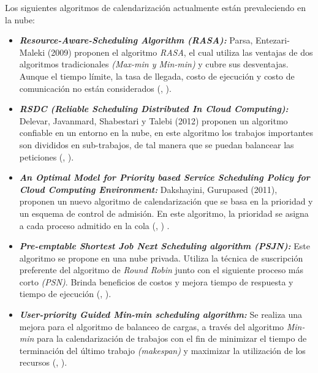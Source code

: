 Los siguientes algoritmos de calendarizaci\'on actualmente est\'an prevaleciendo en la nube:
\begin{itemize}
	\item \textit{\textbf{Resource-Aware-Scheduling Algorithm (RASA):}} Parsa, Entezari-Maleki (2009) proponen el algoritmo \textit{RASA}, el cual utiliza las ventajas de dos algoritmos tradicionales \textit{(Max-min y Min-min)} y cubre sus desventajas. Aunque el tiempo l\'imite, la tasa de llegada, costo de ejecución y costo de comunicaci\'on no est\'an considerados (\citeauthor{parsa2009rasa}, \citeyear{parsa2009rasa}).
	
	
	\item \textit{\textbf{RSDC (Reliable Scheduling Distributed In Cloud Computing):}} Delevar, Javanmard, Shabestari y Talebi (2012) proponen un algoritmo confiable en un entorno en la nube, en este algoritmo los trabajos importantes son divididos en sub-trabajos, de tal manera que se puedan balancear las peticiones (\citeauthor{delavar2012rsdc}, \citeyear{delavar2012rsdc}).
	
	
	\item \textit{\textbf{An Optimal Model for Priority based Service Scheduling Policy for Cloud Computing Environment:}} Dakshayini, Gurupased (2011), proponen un nuevo algoritmo de calendarizaci\'on que se basa en la prioridad y un esquema de control de admisi\'on. En este algoritmo, la prioridad se asigna a cada proceso admitido en la cola (\citeauthor{dakshayini2011optimal}, \citeyear{dakshayini2011optimal}) . 
	
	
	\item \textit{\textbf{Pre-emptable Shortest Job Next Scheduling algorithm (PSJN):}}  Este algoritmo se propone en una nube privada. Utiliza la t\'ecnica de suscripci\'on preferente del algoritmo de \textit{Round Robin} junto con el siguiente proceso m\'as corto \textit{(PSN)}. Brinda beneficios de costos y mejora tiempo de respuesta y tiempo de ejecuci\'on (\citeauthor{nishant}, \citeyear{nishant}). 
	
	
	\item \textit{\textbf{User-priority Guided Min-min scheduling algorithm:}} Se realiza una mejora para el algoritmo de balanceo de cargas, a trav\'es del algoritmo \textit{Min-min} para la calendarizaci\'on de trabajos con el fin de minimizar el tiempo de terminaci\'on del \'ultimo trabajo \textit{(makespan)} y maximizar la utilizaci\'on de los recursos (\citeauthor{chen2013user}, \citeyear{chen2013user}). 
\end{itemize}



